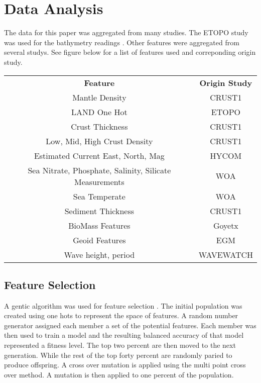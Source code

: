 \section{Data Analysis}
\setlength{\parindent}{10ex}
The data for this paper was aggregated from many studies.
The ETOPO study was used for the bathymetry readings \cite{national1988etopo}.
Other features were aggregated from several studys.
See figure below for a list of features used and correponding origin study. 

%

\begin{table}[htb]
    \begin{tabular}{ |c|c| }
        \hline
            \textbf{Feature} & \textbf{Origin Study} \\
            Mantle Density & CRUST1 \cite{laske2013update} \\
            LAND One Hot & ETOPO \cite{national1988etopo} \\
            Crust Thickness & CRUST1 \cite{laske2013update} \\
            Low, Mid, High Crust Density & CRUST1 \cite{laske2013update} \\
            Estimated Current East, North, Mag & HYCOM \cite{chassignet2009us} \\
            Sea Nitrate, Phosphate, Salinity, Silicate Measurements & WOA \\
            Sea Temperate & WOA \\
            Sediment Thickness & CRUST1 \cite{laske2013update} \\
            BioMass Features & Goyetx \\
            Geoid Features & EGM \cite{pavlis2008earth} \\
            Wave height, period & WAVEWATCH \cite{tolman20072007} \\
        \hline
    \end{tabular}
\end{table}

\subsection{Feature Selection}
A gentic algorithm was used for feature selection \cite{yang1998feature}.
The initial population was created using one hots to represent the space of features.
A random number generator assigned each member a set of the potential features. 
Each member was then used to train a model and the resulting balanced accuracy of that model represented a fitness level.
The top two percent are then moved to the next generation.
While the rest of the top forty percent are randomly paried to produce offspring.
A cross over mutation is applied using the multi point cross over method.
A mutation is then applied to one percent of the population.

